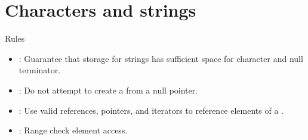 \section{Characters and strings}

\begin{frame}[t]{Rules}
\begin{itemize}
  \item {}: 
        Guarantee that storage for strings has sufficient space for character and null terminator.
  \vfill
  \item {}: 
        Do not attempt to create a  from a null pointer.
  \vfill
  \item {}: 
        Use valid references, pointers, and iterators to reference elements of a .
  \vfill
  \item {}: 
        Range check element access.
\end{itemize}
\end{frame}


